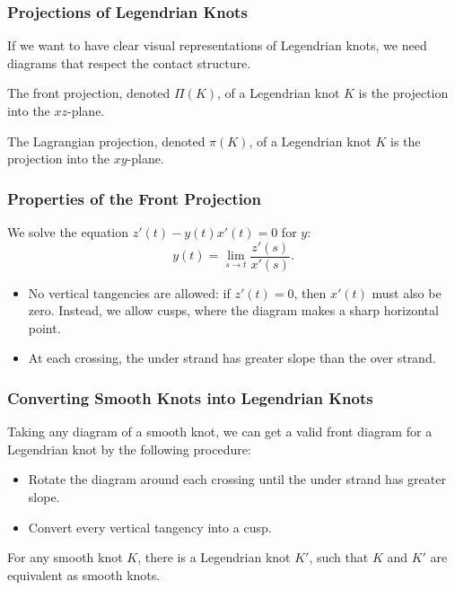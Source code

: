 \documentclass{beamer}
\begin{document}
\begin{frame}
    \frametitle{Projections of Legendrian Knots}
    If we want to have clear visual representations of Legendrian knots,
    we need diagrams that respect the contact structure.

    \begin{definition}
    The \alert{front projection}, denoted \alert{$\Pi(K)$}, of a Legendrian knot $K$ is the projection
    into the $xz$-plane.
    \end{definition}

    \begin{definition}
    The \alert{Lagrangian projection}, denoted \alert{$\pi(K)$}, of a Legendrian knot $K$ is the projection
    into the $xy$-plane.
    \end{definition}
\end{frame}

\begin{frame}
    \frametitle{Properties of the Front Projection}
    We solve the equation $z'(t) - y(t)x'(t) = 0$ for $y$:
    \[ y(t) = \lim_{s\to t} \frac{z'(s)}{x'(s)}. \]

    \begin{itemize}
    \item No vertical tangencies are allowed: if $z'(t) = 0$, then $x'(t)$ must also be zero.
    Instead, we allow \alert{cusps}, where the diagram makes a sharp horizontal point.
    \item At each crossing, the under strand has greater slope than the over strand.
    \end{itemize}
\end{frame}

\begin{frame}
    \frametitle{Converting Smooth Knots into Legendrian Knots}
    Taking any diagram of a smooth knot, we can get a valid front diagram for a Legendrian
    knot by the following procedure:
    \begin{itemize}
    \item Rotate the diagram around each crossing until the under strand has greater slope.
    \item Convert every vertical tangency into a cusp.
    \end{itemize}
    \begin{theorem}
        For any smooth knot $K$, there is a Legendrian knot $K'$, such that $K$ and $K'$ are
        equivalent as smooth knots.
    \end{theorem}
\end{frame}
\end{document}
